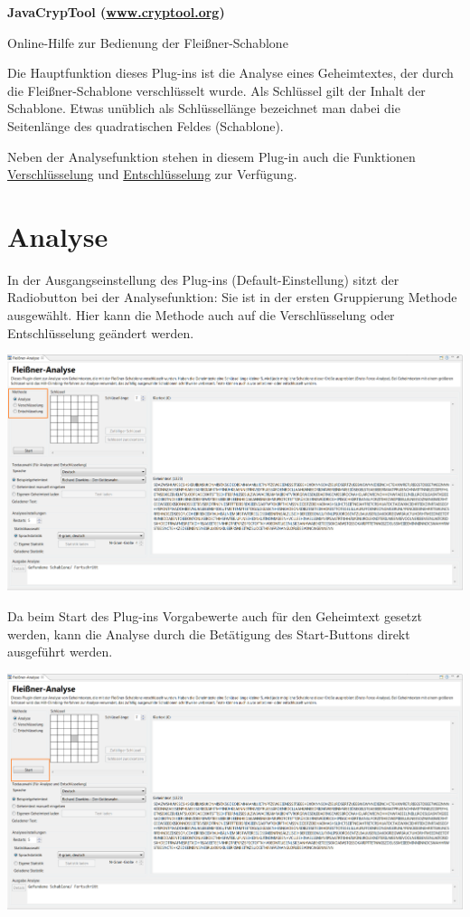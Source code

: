 \documentclass[fontsize=12pt, DIV=15, parskip=half-]{scrartcl}
\theoremstyle{break}
\begin{document}
\begin{center}
\Large\bfseries\sffamily JavaCrypTool (\url{www.cryptool.org})

Online-Hilfe zur Bedienung der Fleißner-Schablone  \\[0.1\baselineskip]
\normalsize\normalfont 
\end{center}
\vspace*{0.5\baselineskip}


\tableofcontents
\newpage

Die Hauptfunktion dieses Plug-ins ist die Analyse eines Geheimtextes, der durch die Fleißner-Schablone verschlüsselt wurde. Als Schlüssel gilt der Inhalt der Schablone. Etwas unüblich als Schlüssellänge bezeichnet man dabei die Seitenlänge des quadratischen Feldes (Schablone).

Neben der Analysefunktion stehen in diesem Plug-in auch die Funktionen \hyperlink{verschl}{Verschlüsselung} und \hyperlink{entschl}{Entschlüsselung} zur Verfügung.


\section{Analyse}
In der Ausgangseinstellung des Plug-ins (Default-Einstellung) sitzt der Radiobutton bei der Analysefunktion: Sie ist in der ersten Gruppierung \glqq Methode\grqq{}
ausgewählt. Hier kann die Methode auch auf die Verschlüsselung oder Entschlüsselung geändert werden.

\includegraphics[scale=0.45]{FleissnerMethods.png}

Da beim Start des Plug-ins Vorgabewerte auch für den Geheimtext gesetzt werden, kann die Analyse durch die Betätigung des \glqq Start\grqq{}-Buttons direkt ausgeführt werden. 

\includegraphics[scale=0.45]{FleissnerStart.png}
\end{document}
